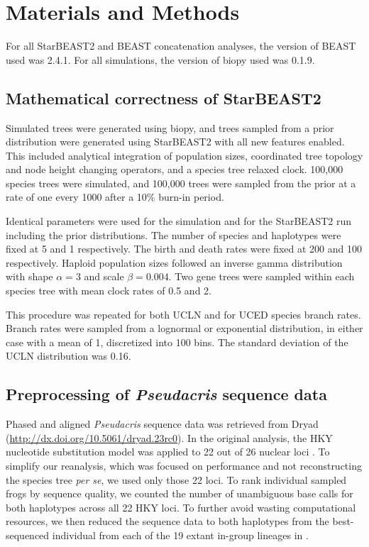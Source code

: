 \documentclass[12pt]{article}
\begin{document}
\section{Materials and Methods}

For all StarBEAST2 and BEAST concatenation analyses, the version of BEAST used was
2.4.1. For all simulations, the version of biopy \citep{biopy} used was 0.1.9.

\subsection{Mathematical correctness of StarBEAST2}

Simulated trees were generated using biopy, and trees sampled from a prior
distribution were generated using StarBEAST2 with all new features enabled. This
included analytical integration of population sizes, coordinated tree topology
and node height changing operators, and a species tree relaxed clock. 100,000
species trees were simulated, and 100,000 trees were sampled from the prior at a
rate of one every 1000 after a 10\% burn-in period.

Identical parameters were used for the simulation and for the StarBEAST2 run
including the prior distributions. The
number of species and haplotypes were fixed at 5 and 1 respectively.
The birth and death rates were fixed at 200 and 100 respectively. Haploid
population sizes followed an inverse gamma distribution with shape $\alpha =
3$ and scale $\beta = 0.004$. Two gene trees were sampled within each species
tree with mean clock rates of 0.5 and 2.

This procedure was repeated for both UCLN and for UCED species branch rates.
Branch rates were sampled from a lognormal or exponential distribution, in
either case with a mean of 1, discretized into 100 bins. The standard deviation
of the UCLN distribution was 0.16.

\subsection{Preprocessing of \textit{Pseudacris} sequence data}

Phased and aligned \textit{Pseudacris} sequence data was retrieved from Dryad
(\url{http://dx.doi.org/10.5061/dryad.23rc0}). In the original analysis, the HKY nucleotide substitution
model \citep{Hasegawa1985, Goldman1993} was applied to 22 out of 26 nuclear loci \citep{Barrow201478}. To simplify
our reanalysis, which was focused on performance and not reconstructing the
species tree \textit{per se}, we used only those 22 loci. To rank
individual sampled frogs by sequence quality, we counted the number of unambiguous base
calls for both haplotypes across all 22 HKY loci. To further avoid wasting
computational resources, we then reduced the sequence data to both haplotypes
from the best-sequenced individual from each of the 19 extant in-group lineages
in \cite{Barrow201478}.
\end{document}

